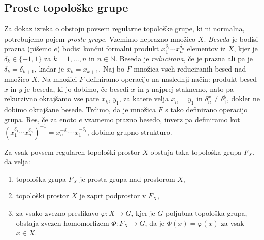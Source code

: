 \documentclass[mat1]{fmfdelo}
\newcommand{\N}{\mathbb N}
\begin{document}
\subsection{Proste topološke grupe} 
Za dokaz izreka o obstoju povsem regularne topološke grupe, ki ni normalna, potrebujemo pojem \emph{proste grupe}. Vzemimo neprazno množico $X$. \emph{Beseda} je bodisi prazna (pišemo $e$) bodisi končni formalni produkt $x_1^{\delta_1}\cdots x_n^{\delta_n}$ elementov iz $X$, kjer je $\delta_k \in \lbrace -1, 1\rbrace$ za $k = 1,\dots,n$ in $n \in \N$. Beseda je \emph{reducirana}, če je prazna ali pa je $\delta_k = \delta_{k+1}$, kadar je $x_k = x_{k+1}$. Naj bo $F$ množica vseh reduciranih besed nad množico $X$. Na množici $F$ definiramo operacijo na naslednji način: produkt besed $x$ in $y$ je beseda, ki jo dobimo, če besedi $x$ in $y$ najprej staknemo, nato pa rekurzivno okrajšamo vse pare $x_k$, $y_1$, za katere velja $x_n = y_1$ in $\delta_n^x \neq \delta_1^y$, dokler ne dobimo okrajšane besede. Trdimo, da je množica $F$ s tako definirano operacijo grupa. Res, če za enoto $e$ vzamemo prazno besedo, inverz pa definiramo kot $(x_1^{\delta_1}\cdots x_n^{\delta_n})^{-1} = x_n^{-\delta_n}\cdots x_1^{-\delta_1}$, dobimo grupno strukturo.

\begin{izrek}\label{izr:prostatopgrupa}
Za vsak povsem regularen topološki prostor $X$ obstaja taka topološka grupa $F_X$, da velja:
\begin{enumerate}
	\item topološka grupa $F_X$ je prosta grupa nad prostorom $X$,\label{podtrd:prosta1}
	\item topološki prostor $X$ je zaprt podprostor v $F_X$,\label{podtrd:prosta2}
	\item za vsako zvezno preslikavo $\varphi\colon X \to G$, kjer je $G$ poljubna topološka grupa, obstaja zvezen homomorfizem $\Phi\colon F_X \to G$, da je $\Phi(x) = \varphi(x)$ za vsak $x \in X$.\label{podtrd:prosta3}
\end{enumerate}
\end{izrek}
\end{document}
